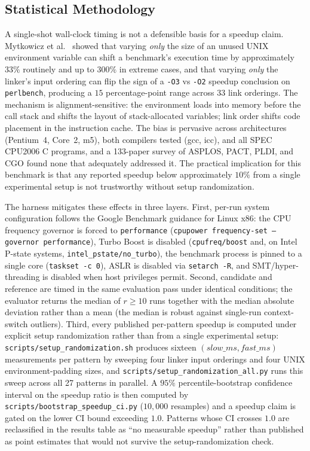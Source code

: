 \subsection{Statistical Methodology}\label{subsec:stats}

A single-shot wall-clock timing is not a defensible basis for a speedup claim. Mytkowicz et al.~\cite{mytkowicz2009producing} showed that varying \emph{only} the size of an unused UNIX environment variable can shift a benchmark's execution time by approximately $33\%$ routinely and up to $300\%$ in extreme cases, and that varying \emph{only} the linker's input ordering can flip the sign of a \texttt{-O3} vs \texttt{-O2} speedup conclusion on \texttt{perlbench}, producing a $15$ percentage-point range across $33$ link orderings. The mechanism is alignment-sensitive: the environment loads into memory before the call stack and shifts the layout of stack-allocated variables; link order shifts code placement in the instruction cache. The bias is pervasive across architectures (Pentium~4, Core~2, m5), both compilers tested (gcc, icc), and all SPEC CPU2006 C programs, and a 133-paper survey of ASPLOS, PACT, PLDI, and CGO found none that adequately addressed it. The practical implication for this benchmark is that any reported speedup below approximately $10\%$ from a single experimental setup is not trustworthy without setup randomization.

The harness mitigates these effects in three layers. First, per-run system configuration follows the Google Benchmark guidance for Linux x86: the CPU frequency governor is forced to \texttt{performance} (\texttt{cpupower frequency-set --governor performance}), Turbo Boost is disabled (\texttt{cpufreq/boost} and, on Intel P-state systems, \texttt{intel\_pstate/no\_turbo}), the benchmark process is pinned to a single core (\texttt{taskset -c 0}), ASLR is disabled via \texttt{setarch -R}, and SMT/hyper-threading is disabled when host privileges permit. Second, candidate and reference are timed in the same evaluation pass under identical conditions; the evaluator returns the median of $r \geq 10$ runs together with the median absolute deviation rather than a mean (the median is robust against single-run context-switch outliers). Third, every published per-pattern speedup is computed under explicit setup randomization rather than from a single experimental setup: \texttt{scripts/setup\_randomization.sh} produces sixteen $(slow\_ms, fast\_ms)$ measurements per pattern by sweeping four linker input orderings and four UNIX environment-padding sizes, and \texttt{scripts/setup\_randomization\_all.py} runs this sweep across all 27 patterns in parallel. A $95\%$ percentile-bootstrap confidence interval on the speedup ratio is then computed by \texttt{scripts/bootstrap\_speedup\_ci.py} ($10{,}000$ resamples) and a speedup claim is gated on the lower CI bound exceeding $1.0$. Patterns whose CI crosses $1.0$ are reclassified in the results table as ``no measurable speedup'' rather than published as point estimates that would not survive the setup-randomization check.

